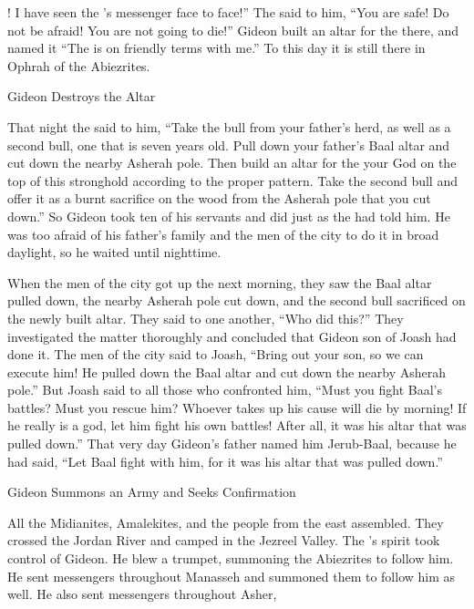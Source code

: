 {{}! I have
seen
the
{}’s
messenger
face
to face!”
The
{}
said
to him, “You are safe! Do not
be afraid! You are not
going to die!”
Gideon
built
an altar
for the
{}
there,
and named
it “The
{}
is on friendly terms
with me.” To
this
day
it is still
there in Ophrah
of the Abiezrites.
\par }{\SH Gideon Destroys the Altar
\par }{\PP {}That night
the {}
said
to him, “Take
the
bull
from your father’s
herd, as well as
a second
bull,
one that is seven
years
old. Pull down
your father’s
Baal
altar
and cut down
the nearby Asherah pole.
Then build
an altar
for the
{}
your God
on
the top
of this
stronghold
according to the proper pattern.
Take
the
second
bull
and offer
it as a burnt sacrifice
on the wood
from the Asherah pole
that
you cut down.”
So
Gideon
took
ten
of his servants
and did
just
as the
{}
had told
him.
He was
too afraid
of his father’s
family
and the
men
of the city
to do
it in broad daylight,
so
he waited
until nighttime.
\par }{\PP {}When the men
of the city
got up
the next morning,
they saw
the Baal
altar
pulled down,
the nearby
Asherah pole
cut down,
and the
second
bull
sacrificed
on
the newly built
altar.
They said
to
one
another, “Who
did
this?” They investigated
the matter
thoroughly and concluded
that Gideon
son
of Joash
had done it.
The men
of the city
said
to
Joash,
“Bring out
your son,
so we
can execute
him! He pulled down
the Baal
altar
and cut down
the nearby
Asherah pole.”
But Joash
said
to all
those who
confronted
him, “Must you
fight Baal’s
battles? Must
you
rescue
him? Whoever
takes up his cause will die
by morning! If
he really is a god,
let him fight his own battles! After all, it was his altar
that
was pulled down.”
That very day
Gideon’s father named
him Jerub-Baal,
because he had said,
“Let Baal
fight
with him, for
it was
his altar
that
was pulled down.”
\par }{\SH Gideon Summons an Army and Seeks Confirmation
\par }{\PP {}All
the Midianites,
Amalekites,
and the people
from the east
assembled.
They crossed
the Jordan River and camped
in the Jezreel
Valley.
The
{}’s
spirit
took control
of Gideon.
He blew
a trumpet,
summoning
the Abiezrites
to follow him.
He sent
messengers
throughout
Manasseh
and summoned
them to follow
him as well.
He also
sent
messengers
throughout Asher,
}
